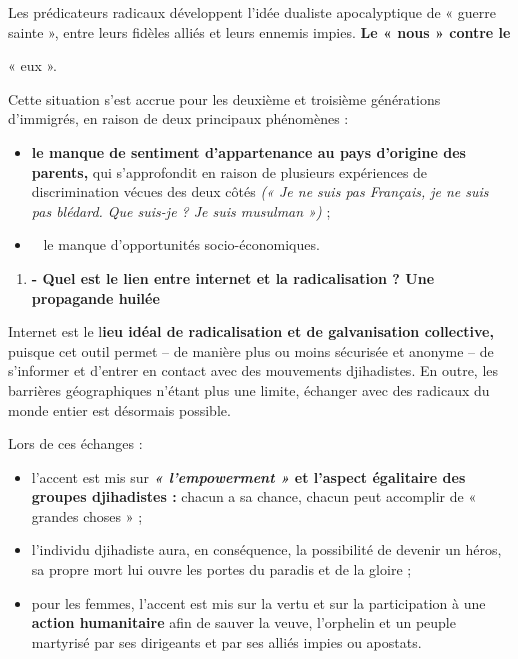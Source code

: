 Les prédicateurs radicaux développent l'idée dualiste apocalyptique de «
guerre sainte », entre leurs fidèles alliés et leurs ennemis impies.
\textbf{Le « nous » contre le}


« eux ».


Cette situation s'est accrue pour les deuxième et troisième générations
d'immigrés, en raison de deux principaux phénomènes :


\begin{itemize}
\item
  
  \textbf{le manque de sentiment d'appartenance au pays d'origine des
  parents,} qui s'approfondit en raison de plusieurs expériences de
  discrimination vécues des deux côtés \emph{(« Je ne suis pas Français,
  je ne suis pas blédard. Que suis-je ? Je suis musulman »)} ;
  
\item ~
  le manque d'opportunités socio-économiques.
\end{itemize}

\begin{enumerate}
\def\labelenumi{\arabic{enumi}.}
\setcounter{enumi}{2}
\item
  \textbf{- Quel est le lien entre internet et la radicalisation ? Une
  propagande huilée}
\end{enumerate}


Internet est le l\textbf{ieu idéal de radicalisation et de galvanisation
collective,} puisque cet outil permet -- de manière plus ou moins
sécurisée et anonyme -- de s'informer et d'entrer en contact avec des
mouvements djihadistes. En outre, les barrières géographiques n'étant
plus une limite, échanger avec des radicaux du monde entier est
désormais possible.

Lors de ces échanges :


\begin{itemize}
\item
  
  l'accent est mis sur \textbf{\emph{« l'empowerment »} et l'aspect
  égalitaire des groupes djihadistes :} chacun a sa chance, chacun peut
  accomplir de « grandes choses » ;
  
\item
  
  l'individu djihadiste aura, en conséquence, la possibilité de devenir
  un héros, sa propre mort lui ouvre les portes du paradis et de la
  gloire ;
  
\item
  
  pour les femmes, l'accent est mis sur la vertu et sur la participation
  à une \textbf{action humanitaire} afin de sauver la veuve, l'orphelin
  et un peuple martyrisé par ses dirigeants et par ses alliés impies ou
  apostats.
  
\end{itemize}


